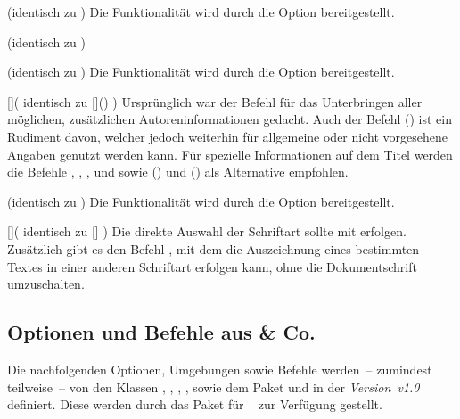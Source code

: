 \begin{Entity*}{}
\begin{Declaration}{}(identisch zu )
\printdeclarationlist%
%
Die Funktionalität wird durch die Option  bereitgestellt.
\end{Declaration}

\begin{Declaration}{}(identisch zu )
\begin{Declaration}{}(identisch zu )
\printdeclarationlist%
%
Die Funktionalität wird durch die Option  bereitgestellt.
\end{Declaration}
\end{Declaration}

\begin{Declaration}{[]}(%
  identisch zu []()%
)
\printdeclarationlist%
%
Ursprünglich war der Befehl für das Unterbringen aller möglichen, zusätzlichen 
Autoreninformationen gedacht. Auch der Befehl () ist ein 
Rudiment davon, welcher jedoch weiterhin für allgemeine oder nicht vorgesehene 
Angaben genutzt werden kann. Für spezielle Informationen auf dem Titel werden 
die Befehle , , , 
 und  sowie 
() und () als Alternative empfohlen.
\end{Declaration}

\begin{Declaration}{}(identisch zu )
\printdeclarationlist%
%
Die Funktionalität wird durch die Option  bereitgestellt.
\end{Declaration}

\begin{Declaration}{[]}(%
  identisch zu []%
)
\printdeclarationlist%
%
Die direkte Auswahl der Schriftart sollte mit  erfolgen. 
Zusätzlich gibt es den Befehl , mit dem die Auszeichnung 
eines bestimmten Textes in einer anderen Schriftart erfolgen kann, ohne die 
Dokumentschrift umzuschalten.
\end{Declaration}
%



\subsection{Optionen und Befehle aus  \& Co.}
%
Die nachfolgenden Optionen, Umgebungen sowie Befehle werden~-- zumindest 
teilweise~-- von den Klassen , , 
, ,  sowie dem Paket 
 und \TUDScript in der \emph{Version~v1.0} definiert. Diese 
werden durch das Paket  für \TUDScript~\vTUDScript{} zur 
Verfügung gestellt.


\end{Entity*}
